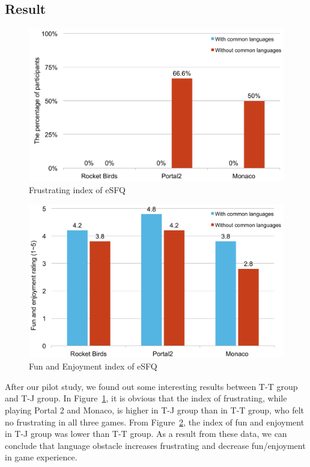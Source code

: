 \subsection{Result}

\begin{figure}[!h]
\centering
\includegraphics[width=0.9\columnwidth]{Figures/PS_Frus.pdf}
\caption{Frustrating index of eSFQ}
\label{fig:PS_Frus}
\end{figure}

\begin{figure}[!h]
\centering
\includegraphics[width=0.9\columnwidth]{Figures/PS_FunAndEnj.pdf}
\caption{Fun and Enjoyment index of eSFQ}
\label{fig:PS_FunAndEnj}
\end{figure}


After our pilot study, we found out some interesting results between T-T group and T-J group. In Figure~\ref{fig:PS_Frus}, it is obvious that the index of frustrating, while playing Portal 2 and Monaco, is higher in T-J group than in T-T group, who felt no frustrating in all three games. From Figure~\ref{fig:PS_FunAndEnj}, the index of fun and enjoyment in T-J group was lower than T-T group. As a result from these data, we can conclude that language obstacle increases frustrating and decrease fun/enjoyment in game experience.


